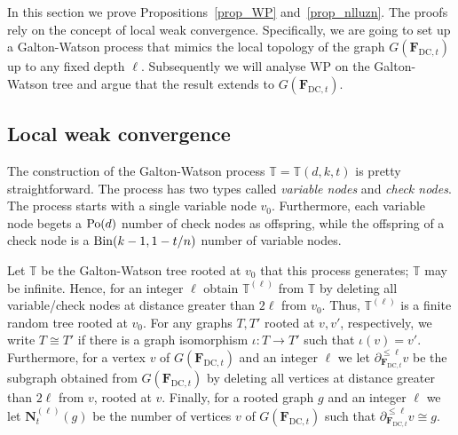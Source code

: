 \documentclass[10pt,reqno]{amsart}
\numberwithin{equation}{section}
\newcommand{\ism}{\cong}
\renewcommand{\vec}[1]{\boldsymbol{#1}}
\newcommand{\FDC}[1]{\PHI_{\mathrm{DC},{#1}}}
\newcommand{\TT}{\mathbb T}
\newcommand\PHI{\vec F}
\newcommand\vN{\vec N}
\newcommand{\Po}{{\rm Po}}
\newcommand{\Bin}{{\rm Bin}}
\newcommand\Prop{Proposition}
\begin{document}
\noindent
In this section we prove \Prop s~\ref{prop_WP} and~\ref{prop_nlluzn}.
The proofs rely on the concept of local weak convergence.
Specifically, we are going to set up a Galton-Watson process that mimics the local topology of the graph $G(\FDC t)$ up to any fixed depth $\ell$.
Subsequently we will analyse WP on the Galton-Watson tree and argue that the result extends to $G(\FDC t)$.

\subsection{Local weak convergence}\label{sec_lwc}
The construction of the Galton-Watson process $\TT=\TT(d,k,t)$ is pretty straightforward.
The process has two types called {\em variable nodes} and {\em check nodes}.
The process starts with a single variable node $v_0$.
Furthermore, each variable node begets a $\Po(d)$ number of check nodes as offspring, while the offspring of a check node is a $\Bin(k-1,1-t/n)$ number of variable nodes.

Let $\TT$ be the Galton-Watson tree rooted at $v_0$ that this process generates; $\TT$ may be infinite.
Hence, for an integer $\ell$ obtain $\TT^{(\ell)}$ from $\TT$ by deleting all variable/check nodes at distance greater than $2\ell$ from $v_0$.
Thus, $\TT^{(\ell)}$ is a finite random tree rooted at $v_0$.
For any graphs $T,T'$ rooted at $v,v'$, respectively, we write $T\ism T'$ if there is a graph isomorphism $\iota:T\to T'$ such that $\iota(v)=v'$.
Furthermore, for a vertex $v$ of $G(\FDC{t})$ and an integer $\ell$ we let $\partial^{\leq\ell}_{\FDC t}v$ be the subgraph obtained from $G(\FDC t)$ by deleting all vertices at distance greater than $2\ell$ from $v$, rooted at $v$.
Finally, for a rooted graph $g$ and an integer $\ell$ we let $\vN_t^{(\ell)}(g)$ be the number of vertices $v$ of $G(\FDC{t})$ such that $\partial^{\leq\ell}_{\FDC t}v\ism g$.
\end{document}

